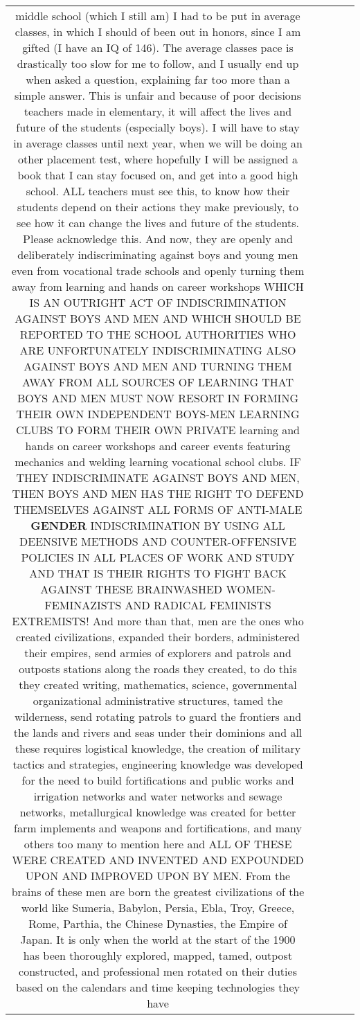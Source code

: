 \documentclass[11pt]{article}
\newlength\mylength
\begin{document}
\begin{center}
\begin{longtable}{|C{.65\mylength}|C{.30\mylength}|C{.12\mylength}|C{.12\mylength}|C{.12\mylength}|}
middle school (which I still am) I had to be put in average classes, in which I should of been out in honors, since I am gifted (I have an IQ of 146). The average classes pace is drastically too slow for me to follow, and I usually end up when asked a question, explaining far too more than a simple answer. This is unfair and because of poor decisions teachers made in elementary, it will affect the lives and future of the students (especially boys). I will have to stay in average classes until next year, when we will be doing an other placement test, where hopefully I will be assigned a book that I can stay focused on, and get into a good high school. ALL teachers must see this, to know how their students depend on their actions they make previously, to see how it can change the lives and future of the students. Please acknowledge this. And now, they are openly and deliberately indiscriminating against boys and young men even from vocational trade schools and openly turning them away from learning and hands on career workshops WHICH IS AN OUTRIGHT ACT OF INDISCRIMINATION AGAINST BOYS AND MEN AND WHICH SHOULD BE REPORTED TO THE SCHOOL AUTHORITIES WHO ARE UNFORTUNATELY INDISCRIMINATING ALSO AGAINST BOYS AND MEN AND TURNING THEM AWAY FROM ALL SOURCES OF LEARNING THAT BOYS AND MEN MUST NOW RESORT IN FORMING THEIR OWN INDEPENDENT BOYS-MEN LEARNING CLUBS TO FORM THEIR OWN PRIVATE learning and hands on career workshops and career events featuring mechanics and welding learning vocational school clubs. IF THEY INDISCRIMINATE AGAINST BOYS AND MEN, THEN BOYS AND MEN HAS THE RIGHT TO DEFEND THEMSELVES AGAINST ALL FORMS OF ANTI-MALE \textbf{GENDER} INDISCRIMINATION BY USING ALL DEENSIVE METHODS AND COUNTER-OFFENSIVE POLICIES IN ALL PLACES OF WORK AND STUDY AND THAT IS THEIR RIGHTS TO FIGHT BACK AGAINST THESE BRAINWASHED WOMEN-FEMINAZISTS AND RADICAL FEMINISTS EXTREMISTS! And more than that, men are the ones who created civilizations, expanded their borders, administered their empires, send armies of explorers and patrols and outposts stations along the roads they created, to do this they created writing, mathematics, science, governmental organizational administrative structures, tamed the wilderness, send rotating patrols to guard the frontiers and the lands and rivers and seas under their dominions and all these requires logistical knowledge, the creation of military tactics and strategies, engineering knowledge was developed for the need to build fortifications and public works and irrigation networks and water networks and sewage networks, metallurgical knowledge was created for better farm implements and weapons and fortifications, and many others too many to mention here and ALL OF THESE WERE CREATED AND INVENTED AND EXPOUNDED UPON AND IMPROVED UPON BY MEN. From the brains of these men are born the greatest civilizations of the world like Sumeria, Babylon, Persia, Ebla, Troy, Greece, Rome, Parthia, the Chinese Dynasties, the Empire of Japan. It is only when the world at the start of the 1900 has been thoroughly explored, mapped, tamed, outpost constructed, and professional men rotated on their duties based on the calendars and time keeping technologies they have 
\end{longtable}
\end{center}
\end{document}
